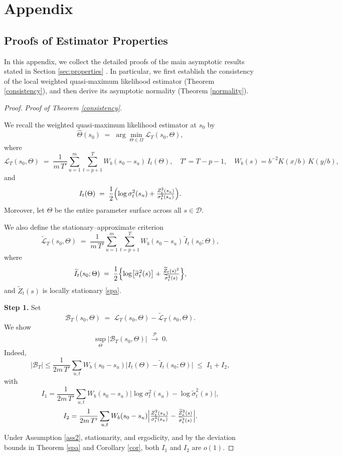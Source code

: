 \documentclass[fleqn,11pt]{article}
\begin{document}
\appendix
\section{Appendix}
 \subsection{Proofs of Estimator Properties}\label{A}
In this appendix, we collect the detailed proofs of the main asymptotic results stated in Section \ref{sec:properties} .  In particular, we first establish the consistency of the local weighted quasi‑maximum likelihood estimator (Theorem \ref{consistency}), and then derive its asymptotic normality (Theorem \ref{normality}). 


\begin{proof}\emph{Proof of Theorem \ref{consistency}.}

We recall the weighted quasi‑maximum likelihood estimator at \(s_{0}\) by
$$
\hat{\Theta}(s_{0}) \;=\; \arg\min_{\Theta\in\Omega}\mathcal{L}_{T}(s_{0},\Theta),
$$
where
$$
\mathcal{L}_{T}(s_{0},\Theta)
\;=\;
\frac{1}{m\,T'} \sum_{u=1}^{m}\sum_{t=p+1}^{T}
W_{b}(s_{0}-s_{u})\,I_{t}(\Theta),
\quad
T' = T - p - 1,
\quad
W_{b}(s) = b^{-2}K(x/b)\,K(y/b),
$$
and
$$
I_{t}(\Theta)
\;=\;
\frac{1}{2}\Bigl(
\log\sigma_{t}^{2}(s_{u})
+
\tfrac{Z_{t}^{2}(s_{u})}{\sigma_{t}^{2}(s_{u})}
\Bigr).
$$
Moreover, let $\Theta$ be the entire parameter surface across all $s \in \mathcal{D}$.


We also define the stationary–approximate criterion
$$
\widetilde{\mathcal{L}}_{T}(s_{0},\Theta)
\;=\;
\frac{1}{m\,T'} \sum_{u=1}^{m}\sum_{t=p+1}^{T}
W_{b}(s_{0}-s_{u})\,\widetilde{I}_{t}(s_{0};\Theta),
$$
where
$$
\widetilde{I}_{t}(s_{0};\Theta)
\;=\;
\frac{1}{2}\Bigl\{
\log\bigl[\widetilde{\sigma}_{t}^{2}(s)\bigr]
+
\tfrac{\widetilde{Z}_{t}(s)^{2}}
     {\widetilde{\sigma}_{t}^{2}(s)}
\Bigr\},
$$
and \(\widetilde{Z}_{t}(s)\) is locally stationary \ref{spa}.

\medskip\noindent\textbf{Step 1.}  
Set
$$
\mathcal{B}_{T}(s_{0},\Theta)
\;=\;
\mathcal{L}_{T}(s_{0},\Theta)
-
\widetilde{\mathcal{L}}_{T}(s_{0},\Theta).
$$
We show
$$
\sup_{\Theta}\bigl|\mathcal{B}_{T}(s_{0},\Theta)\bigr|
\;\xrightarrow{\mathcal{P}}\;0.
$$
Indeed,
$$
\bigl|\mathcal{B}_{T}\bigr|
\le
\frac{1}{2m\,T'}\sum_{u,t}
W_{b}(s_{0}-s_{u})
\bigl|I_{t}(\Theta)-\widetilde{I}_{t}(s_{0};\Theta)\bigr|
\;\le\;
I_{1}+I_{2},
$$
with
$$
I_{1}
=
\frac{1}{2m\,T'}\sum_{u,t}
W_{b}(s_{0}-s_{u})
\bigl|\log\sigma_{t}^{2}(s_{u})
-\log\widetilde{\sigma}_{t}^{2}(s)\bigr|,
$$
$$
I_{2}
=
\frac{1}{2m\,T'}\sum_{u,t}
W_{b}(s_{0}-s_{u})
\Bigl|
\tfrac{Z_{t}^{2}(s_{u})}{\sigma_{t}^{2}(s_{u})}
-
\tfrac{\widetilde{Z}_{t}^{2}(s)}
      {\widetilde{\sigma}_{t}^{2}(s)}
\Bigr|.
$$
Under Assumption \ref{ass2}, stationarity, and ergodicity, and by the deviation bounds in Theorem \ref{spa} and Corollary \ref{cor}, both \(I_{1}\) and \(I_{2}\) are \(o(1)\).


\end{proof}
\end{document}
